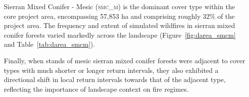 Sierran Mixed Conifer - Mesic (\textsc{smc\_m}) is the dominant cover type within the core project area, encompassing 57,853 ha and comprising roughly 32\% of the project area. The frequency and extent of simulated wildfires in sierran mixed conifer forests varied markedly across the landscape (Figure~\ref{fig:darea_smcm} and Table~\ref{tab:darea_smcm}). %
%

%
%
%
Finally, when stands of mesic sierran mixed conifer forests were adjacent to cover types with much shorter or longer return intervals, they also exhibited a directional shift in local return intervals towards that of the adjacent type, reflecting the importance of landscape context on fire regimes. %


